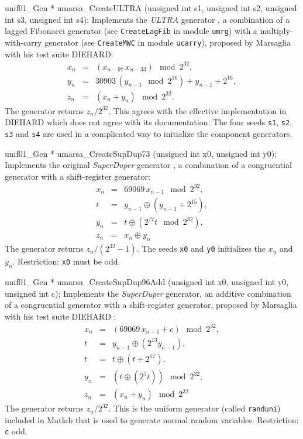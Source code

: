 unif01_Gen * umarsa_CreateULTRA (unsigned int s1, unsigned int s2,
                                 unsigned int s3, unsigned int s4);
\endcode
 \tab Implements the {\it ULTRA} generator \cite{rMAR96a}, a combination of a
   lagged Fibonacci generator (see {\tt CreateLagFib} in module  {\tt umrg})
%
   with a multiply-with-carry generator
   (see {\tt CreateMWC} in module  {\tt ucarry}),
   proposed by Marsaglia with his test suite DIEHARD:
  \begin {eqnarray*}
   x_n &=& (x_{n-97}\,x_{n-33}) \mod 2^{32}, \\
   y_{n} &=& 30903\, \left(y_{n-1} \mod 2^{16}\right) + y_{n-1}\div 2^{16}, \\
   z_n &=& (x_n + y_{n}) \mod 2^{32}.
  \end {eqnarray*} 
   The generator returns $z_n/2^{32}$. This agrees with the effective 
   implementation in DIEHARD which does not agree with its documentation.
   The four seeds  {\tt s1}, {\tt s2}, {\tt s3} and  {\tt s4} are used in
   a complicated way to initialize the component generators.
  \endtab
\code


unif01_Gen * umarsa_CreateSupDup73 (unsigned int x0, unsigned int y0);
\endcode
 \tab Implements the original {\it SuperDuper} generator \cite{rMAR73a}, a
\label{gen:SupDup73}%
   combination of a congruential generator with a shift-register generator:
  \begin {eqnarray*}
   x_n &=& 69069\, x_{n-1} \mod 2^{32}, \\
   t &=& y_{n-1}\oplus \left(y_{n-1} \div 2^{15}\right), \\
   y_{n} &=& t \oplus \left(2^{17} t \mod 2^{32}\right), \\
   z_n &=& x_n \oplus y_{n}
  \end {eqnarray*} 
   The generator returns $z_n / (2^{32} - 1)$. The seeds {\tt x0} and
    {\tt y0} initializes the $x_n$ and $y_n$.
   Restriction: {\tt x0} must be odd.
  \endtab
\code


unif01_Gen * umarsa_CreateSupDup96Add (unsigned int x0, unsigned int y0,
                                       unsigned int c);
\endcode
 \tab Implements the {\it SuperDuper} generator, an additive  combination of a
   congruential generator with a shift-register generator, proposed by
  Marsaglia with his test suite DIEHARD \cite{rMAR96a}:
\label{gen:SupDup96}%
  \begin {eqnarray*}
   x_n &=& (69069\, x_{n-1} + c) \mod 2^{32}, \\
   t &=& y_{n-1}\oplus (2^{13}y_{n-1}), \\
   t &=& t \oplus (t \div 2^{17}), \\
   y_{n} &=& (t \oplus (2^{5}t)) \mod 2^{32}, \\
   z_n &=& (x_n  + y_n) \mod 2^{32}
  \end {eqnarray*}
   The generator returns $z_n/2^{32}$. 
  This is the uniform generator  (called {\tt randuni})
  included in {\sc Matlab} that is used to %
  generate normal random variables.
   Restriction: {\tt c} odd.
  \endtab
\code


